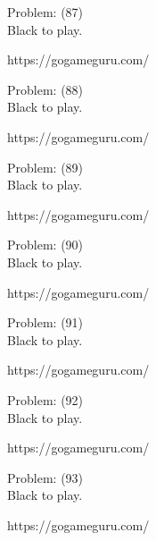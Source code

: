 \documentclass[11pt]{article}
\begin{document}
\begin{minipage}[t]{0.5\textwidth}
  {\centering
  
Problem: (87)\\
Black to play.

https://gogameguru.com/\\
  }
\end{minipage}
\begin{minipage}[t]{0.5\textwidth}
  {\centering
  
Problem: (88)\\
Black to play.

https://gogameguru.com/\\
  }
\end{minipage}
\begin{minipage}[t]{0.5\textwidth}
  {\centering
  
Problem: (89)\\
Black to play.

https://gogameguru.com/\\
  }
\end{minipage}
\begin{minipage}[t]{0.5\textwidth}
  {\centering
  
Problem: (90)\\
Black to play.

https://gogameguru.com/\\
  }
\end{minipage}
\begin{minipage}[t]{0.5\textwidth}
  {\centering
  
Problem: (91)\\
Black to play.

https://gogameguru.com/\\
  }
\end{minipage}
\begin{minipage}[t]{0.5\textwidth}
  {\centering
  
Problem: (92)\\
Black to play.

https://gogameguru.com/\\
  }
\end{minipage}
\begin{minipage}[t]{0.5\textwidth}
  {\centering
  
Problem: (93)\\
Black to play.

https://gogameguru.com/\\
  }
\end{minipage}
\end{document}
